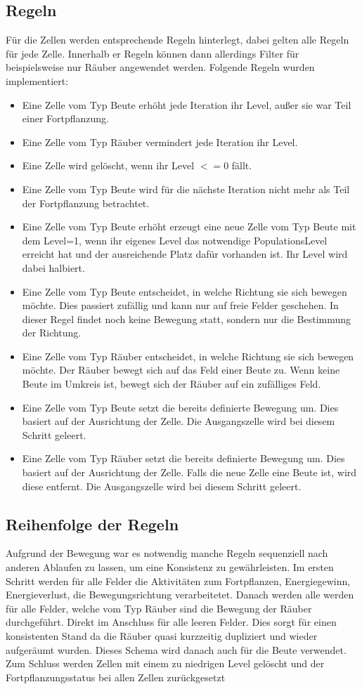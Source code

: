 \documentclass[]{scrartcl}
\begin{document}
\subsection{Regeln}
\label{rules}
Für die Zellen werden entsprechende Regeln hinterlegt, dabei gelten alle Regeln für jede Zelle. Innerhalb er Regeln können dann allerdings Filter für beispielsweise nur Räuber angewendet werden. Folgende Regeln wurden implementiert:
\begin{itemize}
	\item Eine Zelle vom Typ Beute erhöht jede Iteration ihr Level, außer sie war Teil einer Fortpflanzung.
	\item Eine Zelle vom Typ Räuber vermindert jede Iteration ihr Level.
	\item Eine Zelle wird gelöscht, wenn ihr Level \(<=0\) fällt.
	\item Eine Zelle vom Typ Beute wird für die nächste Iteration nicht mehr als Teil der Fortpflanzung betrachtet.
	\item Eine Zelle vom Typ Beute erhöht erzeugt eine neue Zelle vom Typ Beute mit dem Level=1, wenn ihr eigenes Level das notwendige PopulationsLevel erreicht hat und der ausreichende Platz dafür vorhanden ist. Ihr Level wird dabei halbiert.
	\item Eine Zelle vom Typ Beute entscheidet, in welche Richtung sie sich bewegen möchte. Dies passiert zufällig und kann nur auf freie Felder geschehen. In dieser Regel findet noch keine Bewegung statt, sondern nur die Bestimmung der Richtung.
	\item Eine Zelle vom Typ Räuber entscheidet, in welche Richtung sie sich bewegen möchte. Der Räuber bewegt sich auf das Feld einer Beute zu. Wenn keine Beute im Umkreis ist, bewegt sich der Räuber auf ein zufälliges Feld.
	\item Eine Zelle vom Typ Beute setzt die bereits definierte Bewegung um. Dies basiert auf der Ausrichtung der Zelle. Die Ausgangszelle wird bei diesem Schritt geleert.
	\item Eine Zelle vom Typ Räuber setzt die bereits definierte Bewegung um. Dies basiert auf der Ausrichtung der Zelle. Falls die neue Zelle eine Beute ist, wird diese entfernt. Die Ausgangszelle wird bei diesem Schritt geleert.
\end{itemize}

\subsection{Reihenfolge der Regeln}
\label{reihenfolge}
Aufgrund der Bewegung war es notwendig manche Regeln sequenziell nach anderen Ablaufen zu lassen, um eine Konsistenz zu gewährleisten. Im ersten Schritt werden für alle Felder die Aktivitäten zum Fortpflanzen, Energiegewinn, Energieverlust, die Bewegungsrichtung verarbeitetet. Danach werden alle werden für alle Felder, welche vom Typ Räuber sind die Bewegung der Räuber durchgeführt. Direkt im Anschluss für alle leeren Felder. Dies sorgt für einen konsistenten Stand da die Räuber quasi kurzzeitig dupliziert und wieder aufgeräumt wurden. Dieses Schema wird danach auch für die Beute verwendet. Zum Schluss werden Zellen mit einem zu niedrigen Level gelöscht und der Fortpflanzungsstatus bei allen Zellen zurückgesetzt
\end{document}
